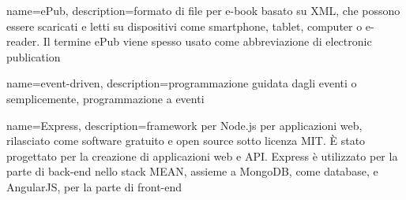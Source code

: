 \hypertarget{E}{}

{
	name=ePub,
	description={formato di file per e-book basato su XML, che possono essere scaricati e letti su dispositivi come smartphone, tablet, computer o e-reader. Il termine ePub viene spesso usato come abbreviazione di electronic publication}
}

{
	name=event-driven,
	description={programmazione guidata dagli eventi o semplicemente, programmazione a eventi}
}

{
	name=Express,
	description={framework per Node.js per applicazioni web, rilasciato come software gratuito e open source sotto licenza MIT. È stato progettato per la creazione di applicazioni web e API. Express è utilizzato per la parte di back-end nello stack MEAN, assieme a MongoDB, come database, e AngularJS, per la parte di front-end}
}